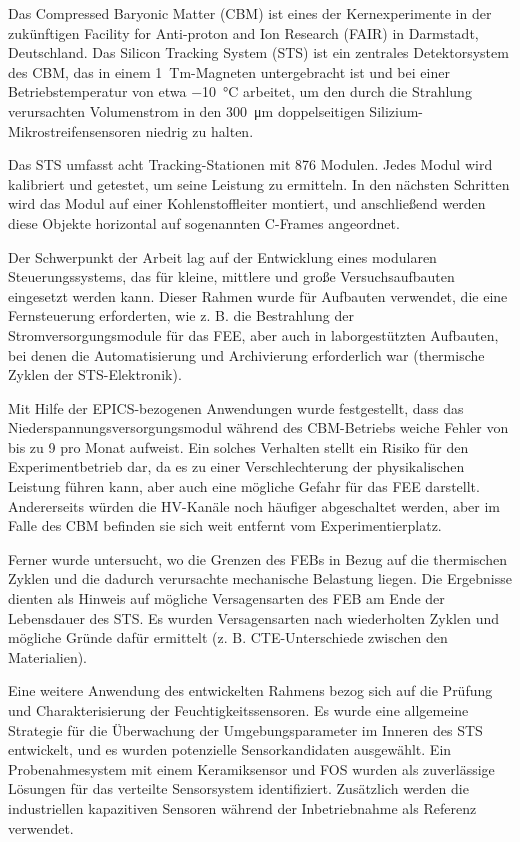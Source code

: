 Das Compressed Baryonic Matter (CBM) ist eines der Kernexperimente in der zukünftigen Facility for Anti-proton and Ion Research (FAIR) in Darmstadt, Deutschland. Das Silicon Tracking System (STS) ist ein zentrales Detektorsystem des CBM, das in einem 1~Tm-Magneten untergebracht ist und bei einer Betriebstemperatur von etwa \SI{-10}{\celsius} arbeitet, um den durch die Strahlung verursachten Volumenstrom in den \SI{300}{\micro\metre} doppelseitigen Silizium-Mikrostreifensensoren niedrig zu halten.

Das STS umfasst acht Tracking-Stationen mit 876 Modulen. Jedes Modul wird kalibriert und getestet, um seine Leistung zu ermitteln. In den nächsten Schritten wird das Modul auf einer Kohlenstoffleiter montiert, und anschließend werden diese Objekte horizontal auf sogenannten C-Frames angeordnet.

Der Schwerpunkt der Arbeit lag auf der Entwicklung eines modularen Steuerungssystems, das für kleine, mittlere und große Versuchsaufbauten eingesetzt werden kann. Dieser Rahmen wurde für Aufbauten verwendet, die eine Fernsteuerung erforderten, wie z. B. die Bestrahlung der Stromversorgungsmodule für das \gls{FEE}, aber auch in laborgestützten Aufbauten, bei denen die Automatisierung und Archivierung erforderlich war (thermische Zyklen der \gls{STS}-Elektronik).

Mit Hilfe der \gls{EPICS}-bezogenen Anwendungen wurde festgestellt, dass das Niederspannungsversorgungsmodul während des \gls{CBM}-Betriebs weiche Fehler von bis zu 9 pro Monat aufweist. Ein solches Verhalten stellt ein Risiko für den Experimentbetrieb dar, da es zu einer Verschlechterung der physikalischen Leistung führen kann, aber auch eine mögliche Gefahr für das \gls{FEE} darstellt. Andererseits würden die \gls{HV}-Kanäle noch häufiger abgeschaltet werden, aber im Falle des \gls{CBM} befinden sie sich weit entfernt vom Experimentierplatz.

Ferner wurde untersucht, wo die Grenzen des \glspl{FEB} in Bezug auf die thermischen Zyklen und die dadurch verursachte mechanische Belastung liegen. Die Ergebnisse dienten als Hinweis auf mögliche Versagensarten des \gls{FEB} am Ende der Lebensdauer des \gls{STS}. Es wurden Versagensarten nach wiederholten Zyklen und mögliche Gründe dafür ermittelt (z. B. \gls{CTE}-Unterschiede zwischen den Materialien). 

Eine weitere Anwendung des entwickelten Rahmens bezog sich auf die Prüfung und Charakterisierung der Feuchtigkeitssensoren. Es wurde eine allgemeine Strategie für die Überwachung der Umgebungsparameter im Inneren des \gls{STS} entwickelt, und es wurden potenzielle Sensorkandidaten ausgewählt. Ein Probenahmesystem mit einem Keramiksensor und \gls{FOS} wurden als zuverlässige Lösungen für das verteilte Sensorsystem identifiziert. Zusätzlich werden die industriellen kapazitiven Sensoren während der Inbetriebnahme als Referenz verwendet.

